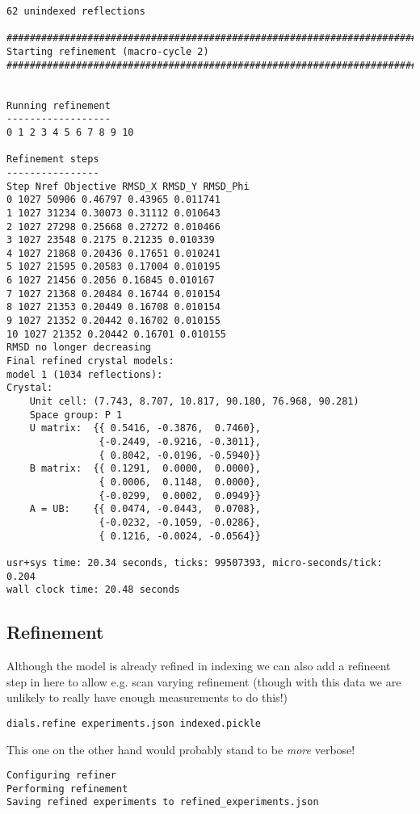 \documentclass[a4paper, 11pt]{article}
\begin{document}
{\begin{verbatim}
62 unindexed reflections

################################################################################
Starting refinement (macro-cycle 2)
################################################################################


Running refinement
------------------
0 1 2 3 4 5 6 7 8 9 10

Refinement steps
----------------
Step Nref Objective RMSD_X RMSD_Y RMSD_Phi
0 1027 50906 0.46797 0.43965 0.011741 
1 1027 31234 0.30073 0.31112 0.010643 
2 1027 27298 0.25668 0.27272 0.010466 
3 1027 23548 0.2175 0.21235 0.010339 
4 1027 21868 0.20436 0.17651 0.010241 
5 1027 21595 0.20583 0.17004 0.010195 
6 1027 21456 0.2056 0.16845 0.010167 
7 1027 21368 0.20484 0.16744 0.010154 
8 1027 21353 0.20449 0.16708 0.010154 
9 1027 21352 0.20442 0.16702 0.010155 
10 1027 21352 0.20442 0.16701 0.010155 
RMSD no longer decreasing
Final refined crystal models:
model 1 (1034 reflections):
Crystal:
    Unit cell: (7.743, 8.707, 10.817, 90.180, 76.968, 90.281)
    Space group: P 1
    U matrix:  {{ 0.5416, -0.3876,  0.7460},
                {-0.2449, -0.9216, -0.3011},
                { 0.8042, -0.0196, -0.5940}}
    B matrix:  {{ 0.1291,  0.0000,  0.0000},
                { 0.0006,  0.1148,  0.0000},
                {-0.0299,  0.0002,  0.0949}}
    A = UB:    {{ 0.0474, -0.0443,  0.0708},
                {-0.0232, -0.1059, -0.0286},
                { 0.1216, -0.0024, -0.0564}}

usr+sys time: 20.34 seconds, ticks: 99507393, micro-seconds/tick: 0.204
wall clock time: 20.48 seconds
\end{verbatim}
}

\subsection{Refinement}

Although the model is already refined in indexing we can also add a
refineent step in here to allow e.g. scan varying refinement (though
with this data we are unlikely to really have enough measurements to
do this!)

{\small
\begin{verbatim}
dials.refine experiments.json indexed.pickle
\end{verbatim}
}

This one on the other hand would probably stand to be \emph{more} verbose!

{\small
\begin{verbatim}
Configuring refiner
Performing refinement
Saving refined experiments to refined_experiments.json
\end{verbatim}
}
\end{document}
